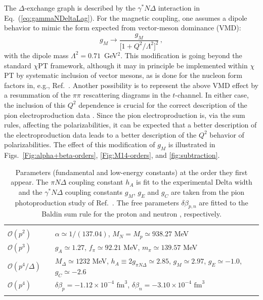 \documentclass[12pt,preprint,tightenlines,
showpacs,preprintnumbers,amsmath,amssymb,
a4paper,nofootinbib]{revtex4-2}
\def\eqlab#1{\label{eq:#1}}
\def\Eqref#1{Eq.~(\ref{eq:#1})}
\def\be{\beta}
\def\de{\delta} \def\De{\Delta}
\begin{document}
The $\Delta$-exchange graph is described by the $\gamma^* N \Delta$ interaction in \Eqref{gammaNDeltaLag}. For the magnetic coupling, one assumes a dipole behavior to mimic the form expected from 
vector-meson dominance (VMD):
\begin{equation}
g_M\to \frac{g_M}{\big[1+Q^2/\Lambda^2\big]^2}\,,\eqlab{modifiedgm}
\end{equation}
with the dipole mass $\Lambda^2=0.71$~GeV${^2}$.
 This modification is going beyond the standard $\chi$PT framework, although it may in principle be implemented 
within $\chi$PT by systematic inclusion of vector mesons, as is done for the nucleon form factors in, e.g., Ref.~\cite{Schindler:2005ke}. Another possibility is to represent the above VMD effect by a 
resummation of the 
$\pi \pi$ rescattering diagrams in the $t$-channel. 
In either case, the inclusion of this $Q^2$ dependence is crucial for the correct description of the pion electroproduction data \cite{Pascalutsa:2005vq}. Since the pion electroproduction is, via the sum rules, affecting the polarizabilities, it can be expected that a better description of the electroproduction data leads to a better description of the $Q^2$ behavior of polarizabilities. The effect of this modification of $g_M$ is illustrated in Figs.~\ref{Fig:alpha+beta-orders}, \ref{Fig:M14-orders},
and \ref{fig:subtraction}.

\begin{table}[b]
\caption{Parameters (fundamental and low-energy constants) \cite{Agashe:2014kda} at the order they first appear. The $\pi N\Delta$ coupling constant $h_A$ is fit to the experimental Delta width and the $\gamma^* N \Delta$ coupling constants $g_M$, $g_E$ and $g_C$ are taken from the pion photoproduction study of Ref.~\cite{Pascalutsa:2005vq}. The free parameters $\de\be_{p,n}$ are fitted to the Baldin sum rule for the proton and neutron \cite{Gryniuk:2015aa,Levchuk:1999zy}, respectively.\label{tab:constants}} 
\begin{tabular}{lp{0.3cm}l}
\hline\\
$\mathcal{O}(p^2)$&&$\alpha\simeq 1/(137.04)$, $M_N=M_p\simeq 938.27$ MeV\\
$\mathcal{O}(p^3)$&&$g_A\simeq 1.27$, $f_\pi\simeq 92.21$ MeV, $m_\pi\simeq 139.57$ MeV \\
$\mathcal{O}(p^4/\varDelta)$&&$M_\Delta\simeq 1232$ MeV, $h_A\equiv 2g_{\pi N \Delta}\simeq 2.85$, $g_M\simeq 2.97$, $g_E\simeq -1.0$, $g_C\simeq -2.6$\\
$\mathcal{O}(p^4)$ && $\de\be_p = -1.12\times 10^{-4}\text{ fm}^3$, $\de\be_n = -3.10\times 10^{-4}\text{ fm}^3$\\
\\
\hline
\end{tabular}
\end{table}
\end{document}
